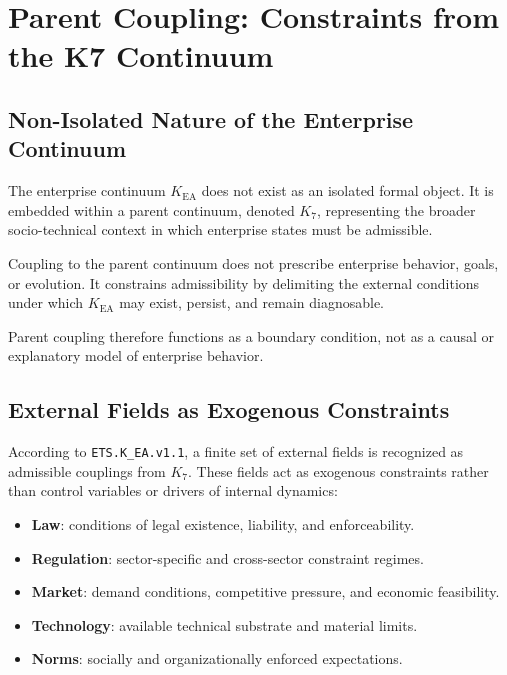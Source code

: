 
\section{Parent Coupling: Constraints from the K7 Continuum}

\subsection{Non-Isolated Nature of the Enterprise Continuum}

The enterprise continuum $K_{\mathrm{EA}}$ does not exist as an isolated
formal object.
It is embedded within a parent continuum, denoted $K_7$, representing
the broader socio-technical context in which enterprise states must be
admissible.

Coupling to the parent continuum does not prescribe enterprise behavior,
goals, or evolution.
It constrains admissibility by delimiting the external conditions under
which $K_{\mathrm{EA}}$ may exist, persist, and remain diagnosable.

Parent coupling therefore functions as a boundary condition, not as a
causal or explanatory model of enterprise behavior.

\subsection{External Fields as Exogenous Constraints}

According to \texttt{ETS.K\_EA.v1.1}, a finite set of external fields is
recognized as admissible couplings from $K_7$.
These fields act as exogenous constraints rather than control variables
or drivers of internal dynamics:

\begin{itemize}
  \item \textbf{Law}: conditions of legal existence, liability, and
        enforceability.
  \item \textbf{Regulation}: sector-specific and cross-sector constraint
        regimes.
  \item \textbf{Market}: demand conditions, competitive pressure, and
        economic feasibility.
  \item \textbf{Technology}: available technical substrate and material
        limits.
  \item \textbf{Norms}: socially and organizationally enforced
        expectations.
\end{itemize}

